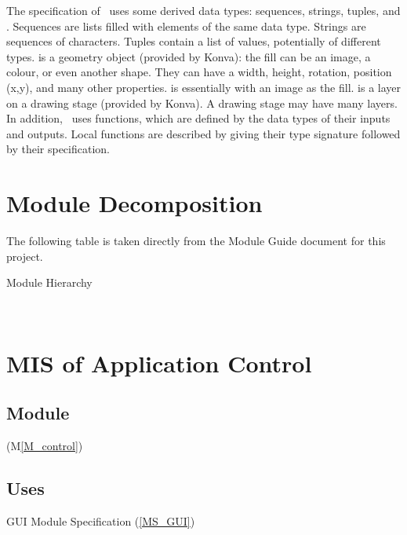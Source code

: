 \documentclass[12pt, titlepage]{article}
\newcommand{\mref}[1]{M\ref{#1}}
\newcommand{\mrefp}[1]{(\mref{#1})}
\newcommand{\msref}[1]{Module Specification (\ref{#1})}
\begin{document}
\noindent
The specification of \progname \ uses some derived data types: sequences, strings,
tuples, and . Sequences are lists filled with elements of the same data type. Strings
are sequences of characters. Tuples contain a list of values, potentially of
different types.  is a geometry object (provided by Konva):
the fill can be an image, a colour, or even another shape. They can have a width, height,
rotation, position (x,y), and many other properties.
 is essentially  with an image as the fill.
 is a layer on a drawing stage (provided by Konva).
A drawing stage may have many layers.
In addition, \progname \ uses functions, which
are defined by the data types of their inputs and outputs. Local functions are
described by giving their type signature followed by their specification.

\newpage

\section{Module Decomposition}

The following table is taken directly from the Module Guide \cite{MG} document for this project.

\begin{table}[h!]
\centering

\caption{Module Hierarchy}
\label{TblMH}
\end{table}

~\newpage




\section{MIS of Application Control} \label{MS_control}

\subsection{Module}
 \mrefp{M_control}

\subsection{Uses}
GUI \msref{MS_GUI}
\end{document}
